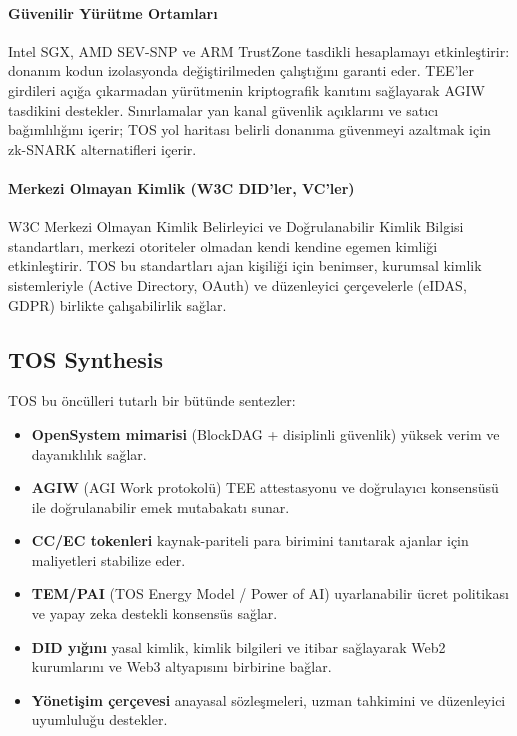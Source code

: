 \documentclass[11pt]{article}
\begin{document}
\paragraph{Güvenilir Yürütme Ortamları} Intel SGX, AMD SEV-SNP ve ARM TrustZone tasdikli hesaplamayı etkinleştirir: donanım kodun izolasyonda değiştirilmeden çalıştığını garanti eder. TEE'ler girdileri açığa çıkarmadan yürütmenin kriptografik kanıtını sağlayarak AGIW tasdikini destekler. Sınırlamalar yan kanal güvenlik açıklarını ve satıcı bağımlılığını içerir; TOS yol haritası belirli donanıma güvenmeyi azaltmak için zk-SNARK alternatifleri içerir.

\paragraph{Merkezi Olmayan Kimlik (W3C DID'ler, VC'ler)} W3C Merkezi Olmayan Kimlik Belirleyici ve Doğrulanabilir Kimlik Bilgisi standartları, merkezi otoriteler olmadan kendi kendine egemen kimliği etkinleştirir. TOS bu standartları ajan kişiliği için benimser, kurumsal kimlik sistemleriyle (Active Directory, OAuth) ve düzenleyici çerçevelerle (eIDAS, GDPR) birlikte çalışabilirlik sağlar.

\subsection{TOS Synthesis}
TOS bu öncülleri tutarlı bir bütünde sentezler:
\begin{itemize}[noitemsep]
  \item \textbf{OpenSystem mimarisi} (BlockDAG + disiplinli güvenlik) yüksek verim ve dayanıklılık sağlar.
  \item \textbf{AGIW} (AGI Work protokolü) TEE attestasyonu ve doğrulayıcı konsensüsü ile doğrulanabilir emek mutabakatı sunar.
  \item \textbf{CC/EC tokenleri} kaynak-pariteli para birimini tanıtarak ajanlar için maliyetleri stabilize eder.
  \item \textbf{TEM/PAI} (TOS Energy Model / Power of AI) uyarlanabilir ücret politikası ve yapay zeka destekli konsensüs sağlar.
  \item \textbf{DID yığını} yasal kimlik, kimlik bilgileri ve itibar sağlayarak Web2 kurumlarını ve Web3 altyapısını birbirine bağlar.
  \item \textbf{Yönetişim çerçevesi} anayasal sözleşmeleri, uzman tahkimini ve düzenleyici uyumluluğu destekler.
\end{itemize}
\end{document}
